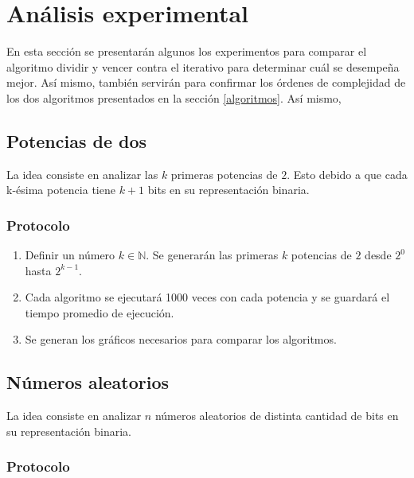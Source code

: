 \documentclass[letter]{article}
\begin{document}
\section{Análisis experimental} \label{experimentos}

En esta sección se presentarán algunos los experimentos para comparar el algoritmo dividir y vencer contra el iterativo para determinar cuál se desempeña mejor. Así mismo, también servirán para confirmar los órdenes de complejidad de los dos algoritmos presentados en la sección \ref{algoritmos}. Así mismo,  \par

\subsection{Potencias de dos} \label{experimentos:potencias}

La idea consiste en analizar las $k$ primeras potencias de $2$. Esto debido a que cada k-ésima potencia tiene $k+1$ bits en su representación binaria. \par

\subsubsection{Protocolo} \label{experimentos:potencias:protocolo}

\begin{enumerate}
    \item Definir un número $k \in\mathbb{N}$. Se generarán las primeras $k$ potencias de $2$ desde $2^0$ hasta $2^{k-1}$.
    \item Cada algoritmo se ejecutará 1000 veces con cada potencia y se guardará el tiempo promedio de ejecución.
    \item Se generan los gráficos necesarios para comparar los algoritmos.
\end{enumerate}

\newpage

\subsection{Números aleatorios} \label{experimentos:aleatorios}

La idea consiste en analizar $n$ números aleatorios de distinta cantidad de bits en su representación binaria. \par

\subsubsection{Protocolo} \label{experimentos:aleatorios:protocolo}
\end{document}
